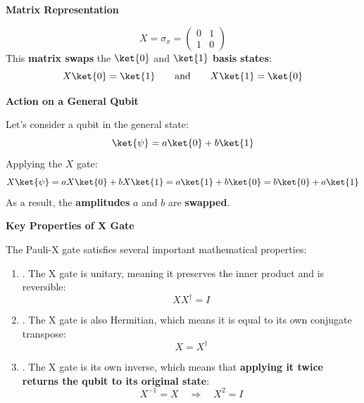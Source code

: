 \begin{flushleft}
   \textcolor{Green3}{ \textbf{Matrix Representation}}
\end{flushleft}
\begin{equation}
   X = \sigma_{x} =
   \begin{pmatrix}
      0 & 1 \\ 1 & 0
   \end{pmatrix}
\end{equation}
This \textbf{matrix swaps} the $\ket{0}$ and $\ket{1}$ \textbf{basis states}:
\begin{equation}
   X\ket{0} = \ket{1} \hspace{2em} \text{and} \hspace{2em} X\ket{1} = \ket{0}
\end{equation}

\highspace
\begin{flushleft}
   \textcolor{Green3}{ \textbf{Action on a General Qubit}}
\end{flushleft}
Let's consider a qubit in the general state:
\begin{equation*}
   \ket{\psi} = a\ket{0} + b\ket{1}
\end{equation*}
Applying the $X$ gate:
\begin{equation*}
   X\ket{\psi} = a X \ket{0} + b X \ket{1} = a \ket{1} + b \ket{0} = b \ket{0} + a \ket{1}
\end{equation*}
As a result, the \textbf{amplitudes} $a$ and $b$ are \textbf{swapped}.

\newpage

\begin{flushleft}
   \textcolor{Green3}{ \textbf{Key Properties of X Gate}}
\end{flushleft}
The Pauli-X gate satisfies several important mathematical properties:
\begin{enumerate}
   \item {}. The X gate is unitary, meaning it preserves the inner product and is reversible:
   \begin{equation*}
      X X^{\dagger} = I
   \end{equation*}


   \item {}. The X gate is also Hermitian, which means it is equal to its own conjugate transpose:
   \begin{equation*}
      X = X^{\dagger}
   \end{equation*}


   \item {}. The X gate is its own inverse, which means that \textbf{applying it twice returns the qubit to its original state}:
   \begin{equation*}
      X^{-1} = X \quad \Rightarrow \quad X^{2} = I
   \end{equation*}
\end{enumerate}

